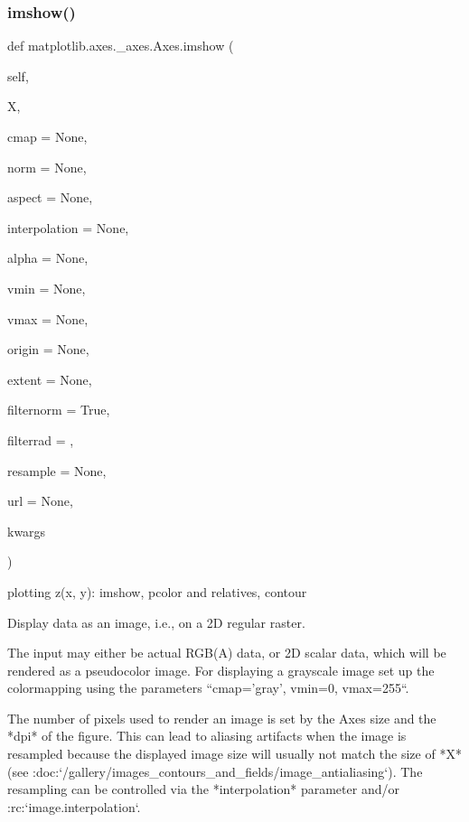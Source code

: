 \begin{DoxyVerb}
\subsubsection{\texorpdfstring{imshow()}{imshow()}}
{\footnotesize\ttfamily def matplotlib.\+axes.\+\_\+axes.\+Axes.\+imshow (\begin{DoxyParamCaption}\item[{}]{self,  }\item[{}]{X,  }\item[{}]{cmap = {\ttfamily None},  }\item[{}]{norm = {\ttfamily None},  }\item[{}]{aspect = {\ttfamily None},  }\item[{}]{interpolation = {\ttfamily None},  }\item[{}]{alpha = {\ttfamily None},  }\item[{}]{vmin = {\ttfamily None},  }\item[{}]{vmax = {\ttfamily None},  }\item[{}]{origin = {\ttfamily None},  }\item[{}]{extent = {\ttfamily None},  }\item[{}]{filternorm = {\ttfamily True},  }\item[{}]{filterrad = {},  }\item[{}]{resample = {\ttfamily None},  }\item[{}]{url = {\ttfamily None},  }\item[{}]{kwargs }\end{DoxyParamCaption})}



plotting z(x, y)\+: imshow, pcolor and relatives, contour 

\begin{DoxyVerb}Display data as an image, i.e., on a 2D regular raster.

The input may either be actual RGB(A) data, or 2D scalar data, which
will be rendered as a pseudocolor image. For displaying a grayscale
image set up the colormapping using the parameters
``cmap='gray', vmin=0, vmax=255``.

The number of pixels used to render an image is set by the Axes size
and the *dpi* of the figure. This can lead to aliasing artifacts when
the image is resampled because the displayed image size will usually
not match the size of *X* (see
:doc:`/gallery/images_contours_and_fields/image_antialiasing`).
The resampling can be controlled via the *interpolation* parameter
and/or :rc:`image.interpolation`.


\end{DoxyVerb}
\end{DoxyVerb}
